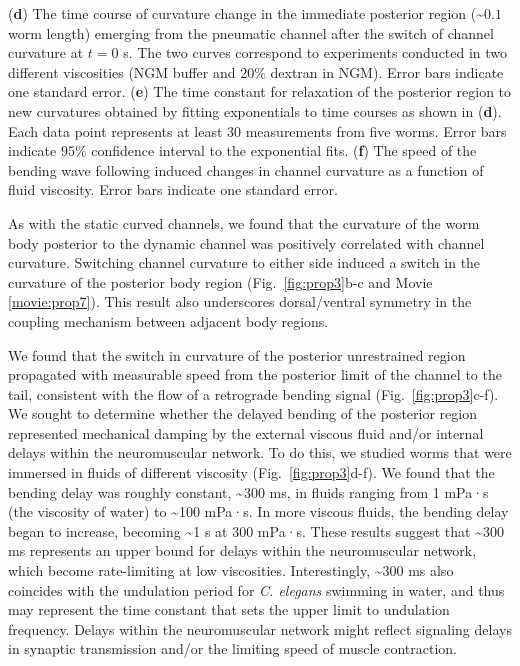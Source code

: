 \begin{FPfigure}
{(\textbf{d}) The time course of curvature change in the immediate posterior region (\textasciitilde$0.1$ worm length) 
emerging from the pneumatic channel after the switch of channel curvature at $t = 0$ s. The two 
curves correspond to experiments conducted in two different viscosities (NGM buffer and $20\%$ 
dextran in NGM). Error bars indicate one standard error.  
(\textbf{e}) The time constant for relaxation of the posterior region to new curvatures obtained by fitting 
exponentials to time courses as shown in (\textbf{d}). Each data point represents at least $30$ 
measurements from five worms. Error bars indicate $95\%$ confidence interval to the exponential 
fits.  
(\textbf{f}) The speed of the bending wave following induced changes in channel curvature as a function 
of fluid viscosity. Error bars indicate one standard error.\label{fig:prop3}}
\end{FPfigure}


As with the static curved channels, we found that the curvature of the worm body posterior to the 
dynamic channel was positively correlated with channel curvature. Switching channel curvature 
to either side induced a switch in the curvature of the posterior body region (Fig.~\ref{fig:prop3}b-c and 
Movie  \ref{movie:prop7}). This result also underscores dorsal/ventral symmetry in the coupling 
mechanism between adjacent body regions. 

We found that the switch in curvature of the posterior unrestrained region propagated with 
measurable speed from the posterior limit of the channel to the tail, consistent with the flow of a 
retrograde bending signal (Fig.~\ref{fig:prop3}c-f). We sought to determine whether the delayed bending of the 
posterior region represented mechanical damping by the external viscous fluid and/or internal 
delays within the neuromuscular network. To do this, we studied worms that were immersed in 
fluids of different viscosity (Fig.~\ref{fig:prop3}d-f). We found that the bending delay was roughly constant, 
\textasciitilde300 ms, in fluids ranging from 1 mPa·s (the viscosity of water) to \textasciitilde100 mPa·s. In more viscous 
fluids, the bending delay began to increase, becoming \textasciitilde1 s at $300$ mPa·s. These results suggest 
that \textasciitilde300 ms represents an upper bound for delays within the neuromuscular network, which 
become rate-limiting at low viscosities. Interestingly, \textasciitilde300 ms also coincides with the undulation 
period for \textit{C. elegans} swimming in water, and thus may represent the time constant that sets the 
upper limit to undulation frequency. Delays within the neuromuscular network might reflect 
signaling delays in synaptic transmission and/or the limiting speed of muscle contraction.

